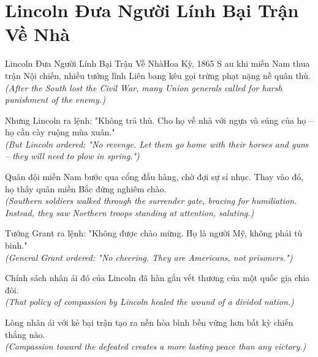 \section{Lincoln Đưa Người Lính Bại Trận Về Nhà}
\begin{truyen}{Lincoln Đưa Người Lính Bại Trận Về Nhà}{Hoa Kỳ, 1865}
S au khi miền Nam thua trận Nội chiến, nhiều tướng lĩnh Liên bang kêu gọi trừng phạt nặng nề quân thù.\\
\textit{(After the South lost the Civil War, many Union generals called for harsh punishment of the enemy.)}

Nhưng Lincoln ra lệnh: "Không trả thù. Cho họ về nhà với ngựa và súng của họ -- họ cần cày ruộng mùa xuân."\\
\textit{(But Lincoln ordered: "No revenge. Let them go home with their horses and guns -- they will need to plow in spring.")}

Quân đội miền Nam bước qua cổng đầu hàng, chờ đợi sự sỉ nhục. Thay vào đó, họ thấy quân miền Bắc đứng nghiêm chào.\\
\textit{(Southern soldiers walked through the surrender gate, bracing for humiliation. Instead, they saw Northern troops standing at attention, saluting.)}

Tướng Grant ra lệnh: "Không được chào mừng. Họ là người Mỹ, không phải tù binh."\\
\textit{(General Grant ordered: "No cheering. They are Americans, not prisoners.")}

Chính sách nhân ái đó của Lincoln đã hàn gắn vết thương của một quốc gia chia đôi.\\
\textit{(That policy of compassion by Lincoln healed the wound of a divided nation.)}

\end{truyen}
\begin{baihoc}
  Lòng nhân ái với kẻ bại trận tạo ra nền hòa bình bền vững hơn bất kỳ chiến thắng nào.\\
  \textit{(Compassion toward the defeated creates a more lasting peace than any victory.)}
\end{baihoc}

